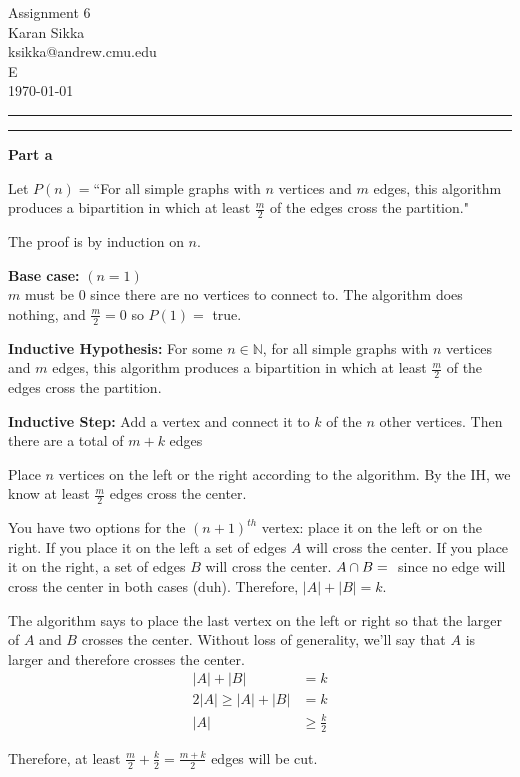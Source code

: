 \documentclass[11pt]{article}
\makeatletter
\newcounter{questionCounter}
\newcounter{partCounter}[questionCounter]
\newenvironment{question}[2][\arabic{questionCounter}]{%
    \setcounter{partCounter}{0}%
    \vspace{.25in} \hrule \vspace{0.5em}%
        \noindent{\bf #2}%
    \vspace{0.8em} \hrule \vspace{.10in}%
    \addtocounter{questionCounter}{1}%
}{}
\newcommand{\myname}{Karan Sikka}
\newcommand{\myandrew}{ksikka@andrew.cmu.edu}
\newcommand{\myhwname}{Assignment 6}
\newcommand{\myrecitation}{E}
\makeatother
\begin{document}
\thispagestyle{plain}

\begin{center}
{\Large \myhwname} \\
\myname \\
\myandrew \\
\myrecitation \\
\today
\end{center}
\begin{question}{Like a fly in a web}
\textbf{Part a}

Let $P(n) = $``For all simple graphs with $n$ vertices and $m$ edges, 
this algorithm produces a bipartition in which 
at least $\frac{m}{2}$ of the edges cross the partition."

The proof is by induction on $n$.

\textbf{Base case:} $(n=1)$\\
$m$ must be 0 since there are no vertices to connect to. 
The algorithm does nothing, and $\frac{m}{2} = 0$ so $P(1) =$ true.

\textbf{Inductive Hypothesis:}
For some $n \in \mathbb{N}$, for all simple graphs with $n$ vertices and $m$ edges, 
this algorithm produces a bipartition in which 
at least $\frac{m}{2}$ of the edges cross the partition.

\textbf{Inductive Step:}
Add a vertex and connect it to $k$ of the $n$ other vertices. Then there are 
a total of $m+k$ edges

Place $n$ vertices on the left or the right according to the algorithm. By the IH, 
we know at least $\frac{m}{2}$ edges cross the center.

You have two options for the $(n+1)^{th}$ vertex: place it on the left or on the right.
If you place it on the left a set of edges $A$ will cross the center. If you place it
on the right, a set of edges $B$ will cross the center. $A \cap B = \null$ since 
no edge will cross the center in both cases (duh). Therefore, $|A| + |B| = k$.

The algorithm says to place the last vertex on the left or right so that 
the larger of $A$ and $B$ crosses the center. Without loss of generality, we'll
say that $A$ is larger and therefore crosses the center. 
\begin{align*}
|A| + |B| &= k\\
2|A| \geq |A| + |B| &= k\\
|A| &\geq \frac{k}{2}
\end{align*}

Therefore, at least $\frac{m}{2}+\frac{k}{2} = \frac{m+k}{2}$ edges will be cut.


\end{question}
\end{document}
